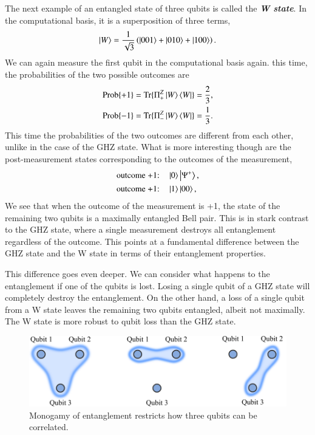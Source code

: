 The next example of an entangled state of three qubits is called the \textit{\textbf{W state}}.
In the computational basis, it is a superposition of three terms,
\begin{equation}
    \left| W \right\rangle = \frac{1}{\sqrt{3}} \left( \left| 001 \right\rangle + \left| 010 \right\rangle + \left| 100 \right\rangle \right).
\end{equation}
We can again measure the first qubit in the computational basis again.
this time, the probabilities of the two possible outcomes are
\begin{align}
    \text{Prob}\{+1\} & = \text{Tr} \{ \Pi^Z_+ \left| W \right\rangle\left\langle W \right| \} = \frac{2}{3}, \\
    \text{Prob}\{-1\} & = \text{Tr} \{ \Pi^Z_- \left| W \right\rangle\left\langle W \right| \} = \frac{1}{3}.
\end{align}
This time the probabilities of the two outcomes are different from each other, unlike in the case of the GHZ state.
What is more interesting though are the post-measurement states corresponding to the outcomes of the measurement,
\begin{align}
    \text{outcome +1:} & \quad \ket{0}\ket{\Psi^+}, \label{eq:14-2_W_post_meas_0} \\
    \text{outcome +1:} & \quad \ket{1}\ket{00},
\end{align}
We see that when the outcome of the measurement is +1, the state of the remaining two qubits is a maximally entangled Bell pair.
This is in stark contrast to the GHZ state, where a single measurement destroys all entanglement regardless of the outcome.
This points at a fundamental difference between the GHZ state and the W state in terms of their entanglement properties.

This difference goes even deeper.
We can consider what happens to the entanglement if one of the qubits is lost.
Losing a single qubit of a GHZ state will completely destroy the entanglement.
On the other hand, a loss of a single qubit from a W state leaves the remaining two qubits entangled, albeit not maximally.
The W state is more robust to qubit loss than the GHZ state.

\begin{figure}[t]
    \centering
    \includegraphics[width=\textwidth]{lesson14/14-2_monogamy.pdf}
    \caption[Monogamy of entanglement.]{Monogamy of entanglement restricts how three qubits can be correlated.}
    \label{fig:14-2_monogamy}
\end{figure}

